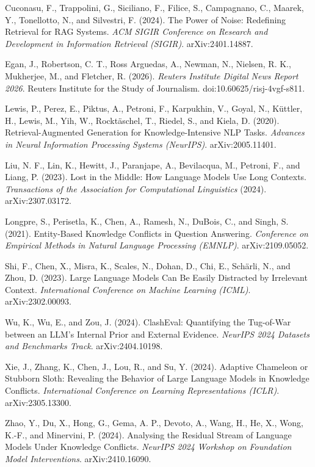 \documentclass[
  12pt,
  letterpaper,
]{article}
\begin{document}
Cuconasu, F., Trappolini, G., Siciliano, F.,
Filice, S., Campagnano, C., Maarek, Y.,
Tonellotto, N., and Silvestri, F. (2024). The
Power of Noise: Redefining Retrieval for RAG
Systems. \emph{ACM SIGIR Conference on Research
and Development in Information Retrieval (SIGIR)}.
arXiv:2401.14887.

Egan, J., Robertson, C. T., Ross Arguedas, A.,
Newman, N., Nielsen, R. K., Mukherjee, M., and
Fletcher, R. (2026). \emph{Reuters Institute
Digital News Report 2026}. Reuters Institute for
the Study of Journalism.
doi:10.60625/risj-4vgf-s811.

Lewis, P., Perez, E., Piktus, A., Petroni, F.,
Karpukhin, V., Goyal, N., Küttler, H., Lewis, M.,
Yih, W., Rocktäschel, T., Riedel, S., and Kiela,
D. (2020). Retrieval-Augmented Generation for
Knowledge-Intensive NLP Tasks. \emph{Advances in
Neural Information Processing Systems (NeurIPS)}.
arXiv:2005.11401.

Liu, N. F., Lin, K., Hewitt, J., Paranjape, A.,
Bevilacqua, M., Petroni, F., and Liang, P. (2023).
Lost in the Middle: How Language Models Use Long
Contexts. \emph{Transactions of the Association
for Computational Linguistics} (2024).
arXiv:2307.03172.

Longpre, S., Perisetla, K., Chen, A., Ramesh, N.,
DuBois, C., and Singh, S. (2021). Entity-Based
Knowledge Conflicts in Question Answering.
\emph{Conference on Empirical Methods in Natural
Language Processing (EMNLP)}. arXiv:2109.05052.

Shi, F., Chen, X., Misra, K., Scales, N., Dohan,
D., Chi, E., Schärli, N., and Zhou, D. (2023).
Large Language Models Can Be Easily Distracted by
Irrelevant Context. \emph{International Conference
on Machine Learning (ICML)}. arXiv:2302.00093.

Wu, K., Wu, E., and Zou, J. (2024). ClashEval:
Quantifying the Tug-of-War between an LLM's
Internal Prior and External Evidence.
\emph{NeurIPS 2024 Datasets and Benchmarks Track}.
arXiv:2404.10198.

Xie, J., Zhang, K., Chen, J., Lou, R., and Su, Y.
(2024). Adaptive Chameleon or Stubborn Sloth:
Revealing the Behavior of Large Language Models in
Knowledge Conflicts. \emph{International
Conference on Learning Representations (ICLR)}.
arXiv:2305.13300.

Zhao, Y., Du, X., Hong, G., Gema, A. P., Devoto,
A., Wang, H., He, X., Wong, K.-F., and Minervini,
P. (2024). Analysing the Residual Stream of
Language Models Under Knowledge Conflicts.
\emph{NeurIPS 2024 Workshop on Foundation Model
Interventions}. arXiv:2410.16090.
\end{document}
